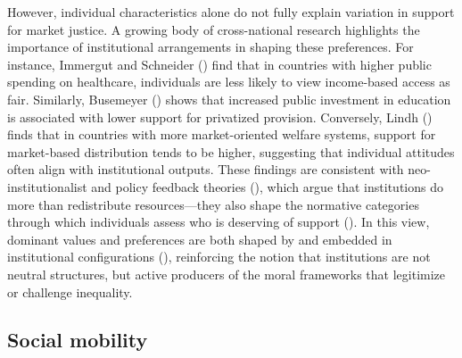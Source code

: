 \documentclass[
  12pt,
]{article}
\begin{document}
However, individual characteristics alone do not fully explain variation
in support for market justice. A growing body of cross-national research
highlights the importance of institutional arrangements in shaping these
preferences. For instance, Immergut and Schneider
() find that in countries with
higher public spending on healthcare, individuals are less likely to
view income-based access as fair. Similarly, Busemeyer
() shows that increased public
investment in education is associated with lower support for privatized
provision. Conversely, Lindh ()
finds that in countries with more market-oriented welfare systems,
support for market-based distribution tends to be higher, suggesting
that individual attitudes often align with institutional outputs. These
findings are consistent with neo-institutionalist and policy feedback
theories (),
which argue that institutions do more than redistribute resources---they
also shape the normative categories through which individuals assess who
is deserving of support
(). In this
view, dominant values and preferences are both shaped by and embedded in
institutional configurations
(), reinforcing the
notion that institutions are not neutral structures, but active
producers of the moral frameworks that legitimize or challenge
inequality.

\subsection{Social mobility}\label{social-mobility}
\end{document}
